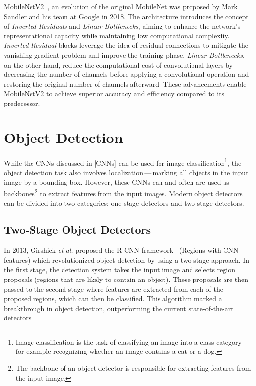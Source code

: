 MobileNetV2~\cite{Sandler2018}, an evolution of the original MobileNet was
proposed by Mark Sandler and his team at Google in 2018. The architecture
introduces the concept of \textit{Inverted Residuals} and \textit{Linear
Bottlenecks}, aiming to enhance the network's representational capacity while
maintaining low computational complexity. \textit{Inverted Residual} blocks
leverage the idea of residual connections to mitigate the vanishing gradient
problem and improve the training phase. \textit{Linear Bottlenecks}, on the
other hand, reduce the computational cost of convolutional layers by decreasing
the number of channels before applying a convolutional operation and restoring
the original number of channels afterward. These advancements enable MobileNetV2
to achieve superior accuracy and efficiency compared to its predecessor.


\section{Object Detection}

While the CNNs discussed in \autoref{CNNs} can be used for image
classification\footnote{Image classification is the task of classifying an image
into a class category\,---\,for example recognizing whether an image contains a
cat or a dog.}, the object detection task also involves
localization\,---\,marking all objects in the input image by a bounding box.
However, these CNNs can and often are used as backbones\footnote{The backbone of an object detector is responsible for extracting
features from the input image.} to extract features from
the input images. Modern object detectors can be divided into two
categories: one-stage detectors and two-stage detectors.



\subsection{Two-Stage Object Detectors}

In 2013, Girshick \textit{et al.} proposed the R-CNN
framework~\cite{Girshick2013} (Regions with CNN features) which revolutionized
object detection by using a two-stage approach. In the first stage, the
detection system takes the input image and selects region proposals (regions
that are likely to contain an object).  These proposals are then passed to the
second stage where features are extracted from each of the proposed regions,
which can then be classified. This algorithm marked a breakthrough in object
detection, outperforming the current state-of-the-art detectors.

